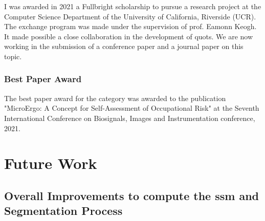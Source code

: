 I was awarded in 2021 a Fullbright scholarship to pursue a research project at the Computer Science Department of the University of California, Riverside (UCR). The exchange program was made under the supervision of prof. Eamonn Keogh. It made possible a close collaboration in the development of \gls{quots}. We are now working in the submission of a conference paper and a journal paper on this topic.

\subsubsection{Best Paper Award}

The best paper award for the category was awarded to the publication "MicroErgo: A Concept for Self-Assessment of Occupational Risk" at the Seventh International Conference on Biosignals, Images and Instrumentation conference, 2021.

\section{Future Work}
\subsection{Overall Improvements to compute the \gls{ssm} and Segmentation Process}

